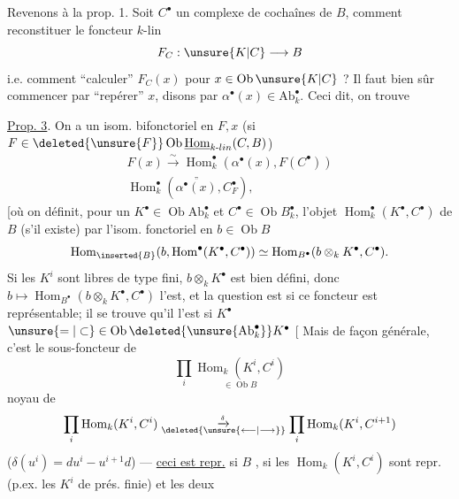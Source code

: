 Revenons à la prop. 1. Soit $C^\bullet$  un complexe
de cochaînes de $B$, comment reconstituer
le foncteur $k$-lin
\[
F_C:\unsure{K|C}\longrightarrow B
\]
i.e. comment ``calculer'' $F_C(x)$ pour $x\in\operatorname{Ob}\unsure{K|C}$ ?
Il faut bien sûr commencer par ``repérer'' $x$,
disons par $\alpha^\bullet(x)\in\mathrm{Ab}_k^\bullet$. Ceci dit, on trouve

\uline{Prop. 3}. On a un isom. bifonctoriel en $F,x$
(si $F\in\deleted{\unsure{F}}\operatorname{Ob}\underline{\operatorname{Hom}}_{k\text{-}lin}(C,B)$)
\[
\begin{gathered}
F(x)\xrightarrow{\sim}\operatorname{Hom}^\bullet_k(\alpha^\bullet(x),F(C^\bullet))\\
\operatorname{Hom}^\bullet_k(\overset{\text{''}}{\alpha^\bullet(x)},C^\bullet_F),
\end{gathered}
\]
[où on définit, pour un $K^\bullet\in\operatorname{Ob}\mathrm{Ab}_k^\bullet$ et
$C^\bullet\in\operatorname{Ob}B_k^\bullet$, l'objet $\operatorname{Hom}^\bullet_k(K^\bullet,C^\bullet)$ de $B$
(s'il existe) par l'isom. fonctoriel en $b\in\operatorname{Ob}B$
\[
\operatorname{Hom}_{\inserted{B}}(b,\operatorname{Hom}^\bullet(K^\bullet,C^\bullet))
\simeq\operatorname{Hom}_{B^\bullet}(b\otimes_k K^\bullet,C^\bullet).
\]
Si les $K^i$ sont libres de type fini, $b\otimes_k K^\bullet$
est bien défini, donc $b\longmapsto\operatorname{Hom}_{B^\bullet}(b\otimes_k K^\bullet,C^\bullet)$
l'est, et la question est si ce foncteur est
représentable; il se trouve qu'il l'est si
$K^\bullet$   $\unsure{=|\subset}\in\operatorname{Ob}\deleted{\unsure{\mathrm{Ab}_k^\bullet}}K^\bullet$ [ Mais de façon
générale, c'est le sous-foncteur de
\[
\prod_i\underset{\in\operatorname{Ob}B}{\operatorname{Hom}_k(K^i,C^i)}
\]
noyau de
\[
\prod_i\operatorname{Hom}_k(K^i,C^i)\mathrel{\substack{\xrightarrow{\delta}\\[-.4ex]\deleted{\unsure{\longleftarrow|\longrightarrow}}}}
\prod_i\operatorname{Hom}_k(K^i,C^{i+1})
\]
($\delta(u^i)=du^i-u^{i+1}d$) --- \uline{ceci est repr.} si
$B$ , si les $\operatorname{Hom}_k(K^i,C^i)$ sont
repr. (p.ex. les $K^i$ de prés. finie) et les deux
